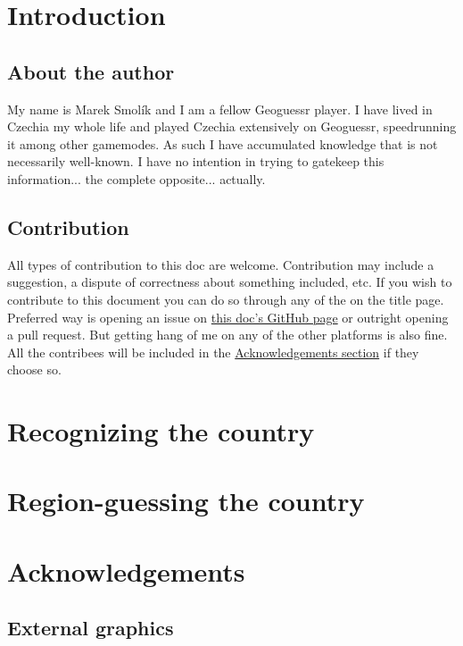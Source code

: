 \documentclass[12pt, oneside]{article}
\begin{document}
\clearpage

\setcounter{page}{1}

\section{Introduction}

\subsection{About the author}

My name is Marek Smolík and I am a fellow Geoguessr player. I have lived in Czechia my whole life and played Czechia extensively on Geoguessr, speedrunning it among other gamemodes. As such I have accumulated knowledge that is not necessarily well-known. I have no intention in trying to gatekeep this information... the complete opposite... actually.

\subsection{Contribution}

All types of contribution to this doc are welcome. Contribution may include a suggestion, a dispute of correctness about something included, etc. If you wish to contribute to this document you can do so through any of the on the title page. Preferred way is opening an issue on \href{https://github.com/dynamo58/geoguessr-czechia-guide}{this doc's GitHub page} or outright opening a pull request. But getting hang of me on any of the other platforms is also fine. All the contribees will be included in the \hyperref[sec:ack]{Acknowledgements section} if they choose so.

\newpage
\section{Recognizing the country}

\newpage
\section{Region-guessing the country}

\newpage
\section{Acknowledgements}
\label{sec:ack}

\subsection{External graphics}
\end{document}
